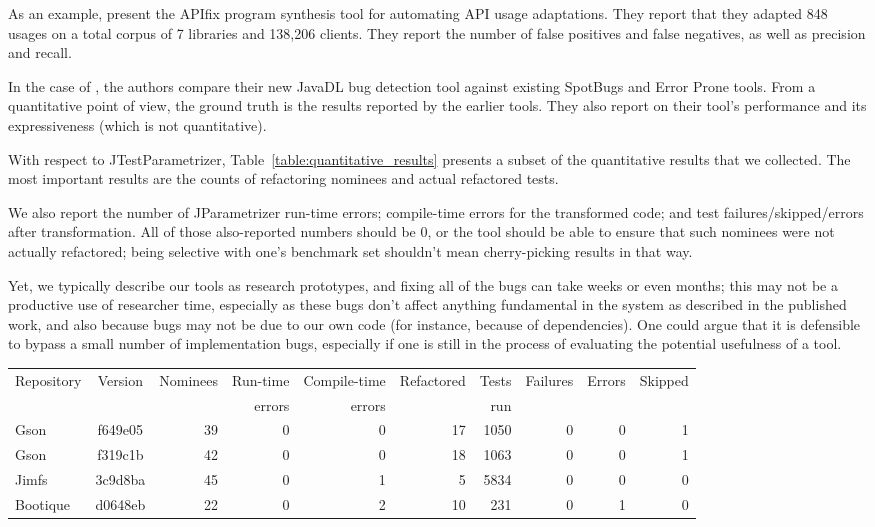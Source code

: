 As an example,  present the {\sc APIfix} program synthesis tool for automating API usage adaptations. They report that they adapted 848 usages on a total corpus of 7 libraries and 138,206 clients. They report the number of false positives and false negatives, as well as precision and recall.

In the case of \cite{dura21:_javad}, the authors compare their new {\sc JavaDL} bug detection tool against existing SpotBugs and Error Prone tools. From a quantitative point of view, the ground truth is the results reported by the earlier tools. They also report on their tool's performance and its expressiveness (which is not quantitative).

With respect to JTestParametrizer,
Table~\ref{table:quantitative_results} presents a subset of the
quantitative results that we collected. The most important results are
the counts of refactoring nominees and actual refactored tests. 

We
also report the number of JParametrizer run-time errors; compile-time
errors for the transformed code; and test failures/skipped/errors
after transformation. All of those also-reported numbers should be 0, or the tool should be
able to ensure that such nominees were not actually refactored; being
selective with one's benchmark set shouldn't mean cherry-picking
results in that way. 

Yet, we typically describe our tools as research
prototypes, and fixing all of the bugs can take weeks or even months;
this may not be a productive use of researcher time, especially as
these bugs don't affect anything fundamental in the system as
described in the published work, and also because bugs may not be due
to our own code (for instance, because of dependencies).  One could
argue that it is defensible to bypass a small number of implementation
bugs, especially if one is still in the process of evaluating
the potential usefulness of a tool.

\begin{table*}[h!]
\centering
\begin{tabular}{l c r r r r r r r r} 
 Repository & Version & Nominees & Run-time  & Compile-time  & Refactored & Tests & Failures & Errors & Skipped \\
  &  &  & errors & errors &  & run &  &  &  \\ [0.75ex]
 \hline\hline
 Gson & f649e05 & 39 & 0 & 0 & 17 & 1050 & 0 & 0 & 1 \\ 
 Gson & f319c1b & 42 & 0 & 0 & 18 & 1063 & 0 & 0 & 1 \\ 
 Jimfs & 3c9d8ba & 45 & 0 & 1 & 5 & 5834 & 0 & 0 & 0 \\ 
 Bootique & d0648eb & 22 & 0 & 2 & 10 & 231 & 0 & 1 & 0 \\ 
\end{tabular}
\caption{JTestParametrizer Quantitative Results}
\label{table:quantitative_results}
\end{table*}


